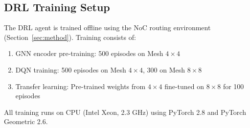 \subsection{DRL Training Setup}

The DRL agent is trained offline using the NoC routing environment (Section~\ref{sec:method}). Training consists of:
\begin{enumerate}
    \item GNN encoder pre-training: 500 episodes on Mesh $4\times4$
    \item DQN training: 500 episodes on Mesh $4\times4$, 300 on Mesh $8\times8$
    \item Transfer learning: Pre-trained weights from $4\times4$ fine-tuned on $8\times8$ for 100 episodes
\end{enumerate}

All training runs on CPU (Intel Xeon, 2.3 GHz) using PyTorch 2.8 and PyTorch Geometric 2.6.
